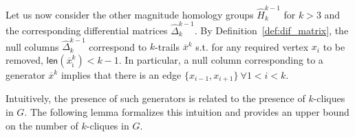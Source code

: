 \documentclass{article}
\newcommand{\len}{\textsf{len}}
\begin{document}
	
	
	
	
	Let us now consider the other magnitude homology groups $\widehat{H}_k^{k-1}$ for $k>3$ and the corresponding differential matrices $\widehat{\Delta}_k^{k-1}$.
	By Definition~\ref{def:dif_matrix}, the null columns $\widehat{\Delta}_k^{k-1}$ correspond to $k$-trails $\overline{x}^k$ s.t. for any required vertex $x_i$ to be removed, $\len(\overline{x}^k_{\hat{\imath}})<k-1$. In particular, a null column corresponding to a generator $\overline{x}^k$ implies that there is an edge $\{x_{i-1},x_{i+1}\}~\forall 1<i<k$. 
	
	Intuitively, the presence of such generators is related to the presence of $k$-cliques in $G$.
	The following lemma formalizes this intuition and provides an upper bound on the number of $k$-cliques in $G$.
	
\end{document}
